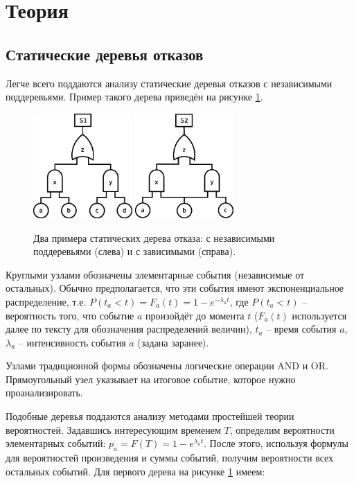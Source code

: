 \documentclass[a4paper, 12pt]{article}
\begin{document}
\section{Теория}

\subsection{Статические деревья отказов}

Легче всего поддаются анализу статические деревья отказов с независимыми поддеревьями. Пример такого дерева приведён на рисунке \ref{fig:sft1}.

\begin{figure}[p]
  \centering
  \includegraphics[height=4.0cm]{s1}
  \hspace{1.0cm}
  \includegraphics[height=4.0cm]{s2}
  \caption{Два примера статических дерева отказа: с независимыми поддеревьями (слева) и с зависимыми (справа).}
  \label{fig:sft1}
\end{figure}

Круглыми узлами обозначены элементарные события (независимые от остальных). Обычно предполагается, что эти события имеют экспоненциальное распределение, т.е. $P(t_a < t) = F_a(t) = 1 - e^{-\lambda_a t}$, где $P(t_a < t)$ -- вероятность того, что событие $a$ произойдёт до момента $t$ ($F_a(t)$ используется далее по тексту для обозначения распределений величин), $t_a$ -- время события $a$, $\lambda_a$ -- интенсивность события $a$ (задана заранее).

Узлами традиционной формы обозначены логические операции AND и OR. Прямоугольный узел указывает на итоговое событие, которое нужно проанализировать.

Подобные деревья поддаются анализу методами простейшей теории вероятностей. Задавшись интересующим временем $T$, определим вероятности элементарных событий: $p_a = F(T) = 1 - e^{\lambda_a t}$. После этого, используя формулы для вероятностей произведения и суммы событий, получим вероятности всех остальных событий. Для первого дерева на рисунке \ref{fig:sft1} имеем:
\end{document}
